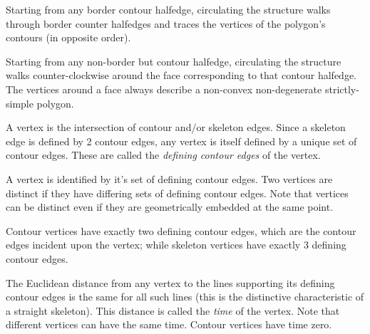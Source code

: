 Starting from any border contour halfedge, circulating the structure
walks through border counter halfedges and traces the vertices of the
polygon's contours (in opposite order).

Starting from any non-border but contour halfedge, circulating the
structure walks counter-clockwise around the face corresponding
to that contour halfedge. The vertices around a face always describe
a non-convex non-degenerate strictly-simple polygon.

A vertex is the intersection of contour and/or skeleton edges. Since a
skeleton edge is defined by 2 contour edges, any vertex is itself
defined by a unique set of contour edges. These are called the
{\em defining contour edges} of the vertex.

A vertex is identified by it's set of defining contour edges. Two
vertices are distinct if they have differing sets of defining contour
edges.  Note that vertices can be distinct even if they are geometrically
embedded at the same point.
 
Contour vertices have exactly two defining contour edges, which are
the contour edges incident upon the vertex; while skeleton vertices
have exactly 3 defining contour edges.

The Euclidean distance from any vertex to the lines
supporting its defining contour edges is the same for all such lines
(this is the distinctive characteristic of a straight skeleton). This
distance is called the {\em time} of the vertex. Note that
different vertices can have the same time. Contour vertices have time
zero.

